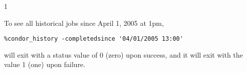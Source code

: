 \begin{ManPage}{\label{man-condor-history}}{1}
\Examples

To see all historical jobs since April 1, 2005 at 1pm,
\footnotesize
\begin{verbatim}
%condor_history -completedsince '04/01/2005 13:00'
\end{verbatim}
\normalsize


\ExitStatus

 will exit with a status value of 0 (zero) upon success,
and it will exit with the value 1 (one) upon failure.

\end{ManPage}
